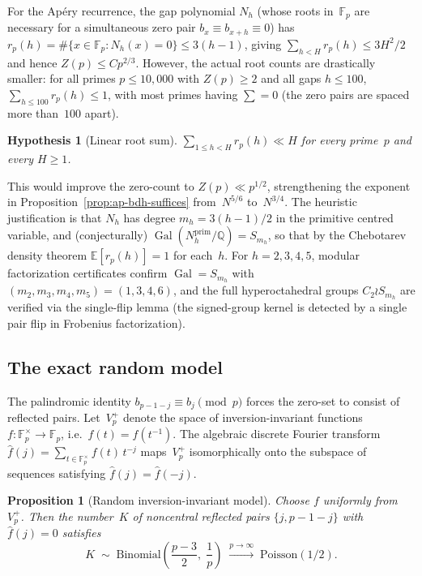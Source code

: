 \documentclass[11pt]{article}
\newtheorem{proposition}[theorem]{Proposition}
\newtheorem{hypothesis}[theorem]{Hypothesis}
\theoremstyle{definition}
\theoremstyle{remark}
\begin{document}
For the Ap\'ery recurrence, the gap polynomial
$N_h$ (whose roots in~$\mathbb{F}_p$ are
necessary for a simultaneous zero pair
$b_x \equiv b_{x+h} \equiv 0$)
has $r_p(h) = \#\{x \in \mathbb{F}_p : N_h(x) = 0\}
\le 3(h-1)$, giving $\sum_{h < H} r_p(h) \le 3H^2/2$
and hence $Z(p) \le Cp^{2/3}$.
However, the actual root counts are drastically
smaller: for all primes $p \le 10{,}000$ with
$Z(p) \ge 2$ and all gaps $h \le 100$,
$\sum_{h \le 100} r_p(h) \le 1$,
with most primes having $\sum = 0$
(the zero pairs are spaced more than~$100$ apart).

\begin{hypothesis}[Linear root sum]\label{hyp:linear-root}
$\sum_{1 \le h < H} r_p(h) \ll H$ for every
prime~$p$ and every $H \ge 1$.
\end{hypothesis}

This would improve the zero-count to
$Z(p) \ll p^{1/2}$, strengthening the exponent
in Proposition~\ref{prop:ap-bdh-suffices}
from~$N^{5/6}$ to~$N^{3/4}$.
The heuristic justification is that $N_h$
has degree $m_h = 3(h{-}1)/2$ in the
primitive centred variable, and
(conjecturally)
$\operatorname{Gal}(N_h^{\mathrm{prim}}
/\mathbb{Q}) = S_{m_h}$,
so that by the Chebotarev density theorem
$\mathbb{E}[r_p(h)] = 1$ for each~$h$.
For $h = 2, 3, 4, 5$, modular
factorization certificates confirm
$\operatorname{Gal} = S_{m_h}$ with
$(m_2, m_3, m_4, m_5) = (1, 3, 4, 6)$,
and the full hyperoctahedral groups
$C_2 \wr S_{m_h}$ are verified
via the single-flip lemma
(the signed-group kernel is
detected by a single pair flip
in Frobenius factorization).

\subsection{The exact random model}\label{ssec:random-model}

The palindromic identity $b_{p-1-j} \equiv b_j \pmod{p}$
forces the zero-set to consist of reflected pairs.
Let~$V_p^+$ denote the space of inversion-invariant
functions $f \colon \mathbb{F}_p^\times \to \mathbb{F}_p$,
i.e.\ $f(t) = f(t^{-1})$.
The algebraic discrete Fourier transform
$\hat{f}(j) = \sum_{t \in \mathbb{F}_p^\times} f(t)\,t^{-j}$
maps~$V_p^+$ isomorphically onto the subspace of
sequences satisfying $\hat{f}(j) = \hat{f}(-j)$.

\begin{proposition}[Random inversion-invariant model]\label{prop:random}
Choose $f$ uniformly from~$V_p^+$.
Then the number~$K$ of noncentral reflected pairs
$\{j, p{-}1{-}j\}$ with $\hat{f}(j) = 0$ satisfies
\[
  K \;\sim\; \mathrm{Binomial}\!\left(
  \frac{p-3}{2},\;\frac{1}{p}\right)
  \;\xrightarrow{p \to \infty}\;
  \mathrm{Poisson}(1/2).
\]
\end{proposition}
\end{document}
